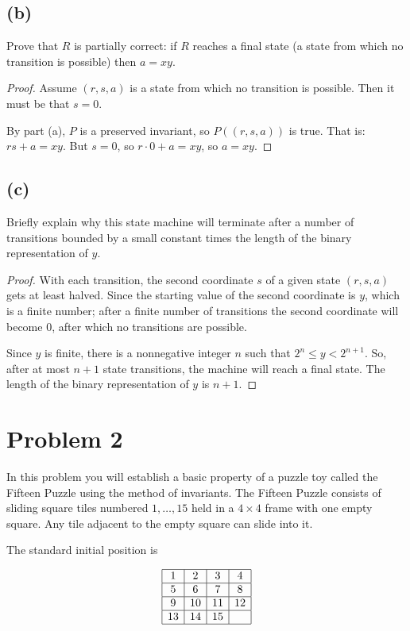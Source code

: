 \documentclass[14pt]{extarticle}
\begin{document}
\subsection{(b)}
Prove that $R$ is partially correct: if $R$ reaches a final state (a state from which no transition is possible) then $a = xy$.
\begin{proof}
Assume $(r, s, a)$ is a state from which no transition is possible. Then it must be that $s = 0$.

By part (a), $P$ is a preserved invariant, so $P((r, s, a))$ is true. That is: $rs + a = xy$. But $s = 0$, so $r \cdot 0 + a = xy$, so $a = xy$.
\end{proof}

\subsection{(c)}
Briefly explain why this state machine will terminate after a number of transitions bounded by a small constant times the length of the binary representation of $y$.
\begin{proof}
With each transition, the second coordinate $s$ of a given state $(r, s, a)$ gets at least halved. Since the starting value of the second coordinate is $y$, which is a finite number; after a finite number of transitions the second coordinate will become 0, after which no transitions are possible.

Since $y$ is finite, there is a nonnegative integer $n$ such that $2^n \leq y < 2^{n+1}$. So, after at most $n + 1$ state transitions, the machine will reach a final state. The length of the binary representation of $y$ is $n+1$.
\end{proof}

\section{Problem 2}
In this problem you will establish a basic property of a puzzle toy called the Fifteen Puzzle using the method of invariants. The Fifteen Puzzle consists of sliding square tiles numbered $1, \ldots, 15$ held in a $4 \times 4$ frame with one empty square. Any tile adjacent to the empty square can slide into it.

The standard initial position is

$$
\begin{array}{|c|c|c|c|}
\hline
1 & 2 & 3 & 4 \\
\hline 
5 & 6 & 7 & 8 \\
\hline 
9 & 10 & 11 & 12 \\
\hline 
13 & 14 & 15 &  \\
\hline 
\end{array}
$$
\end{document}
